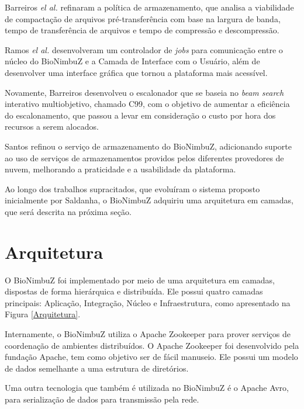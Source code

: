 Barreiros \textit{el al.}\cite{BioNimbuZ_BioCirrus} refinaram a política de armazenamento, que analisa a viabilidade de compactação de arquivos pré-transferência com base na largura de banda, tempo de transferência de arquivos e tempo de compressão e descompressão.

Ramos \textit{el al.}\cite{BioNimbuZ_Ramos} desenvolveram um controlador de \textit{jobs} para comunicação entre o núcleo do BioNimbuZ e a Camada de Interface com o Usuário, além de desenvolver uma interface gráfica que tornou a plataforma mais acessível.

Novamente, Barreiros\cite{BioNimbuZ_Willian_C99} desenvolveu o escalonador que se baseia no \textit{beam search} interativo multiobjetivo, chamado C99, com o objetivo de aumentar a eficiência do escalonamento, que passou a levar em consideração o custo por hora dos recursos a serem alocados.

Santos\cite{BioNimbuZ_Santos} refinou o serviço de armazenamento do BioNimbuZ, adicionando suporte ao uso de serviços de armazenamentos providos pelos diferentes provedores de nuvem, melhorando a praticidade e a usabilidade da plataforma.

Ao longo dos trabalhos supracitados, que evoluíram o sistema proposto inicialmente por Saldanha\cite{Saldanha_BioNimbus}, o BioNimbuZ adquiriu uma arquitetura em camadas, que será descrita na próxima seção.

\section{Arquitetura}
O BioNimbuZ foi implementado por meio de uma arquitetura em camadas, dispostas de forma hierárquica e distribuída. Ele possui quatro camadas principais: Aplicação, Integração, Núcleo e Infraestrutura, como apresentado na Figura \ref{Arquitetura}.

Internamente, o BioNimbuZ utiliza o Apache Zookeeper\cite{Zookeeper} para prover serviços de coordenação de ambientes distribuídos. O Apache Zookeeper foi desenvolvido pela fundação Apache\cite{Apache}, tem como objetivo ser de fácil manuseio. Ele possui um modelo de dados semelhante a uma estrutura de diretórios.

Uma outra tecnologia que também é utilizada no BioNimbuZ é o Apache Avro\cite{Avro}, para serialização de dados para transmissão pela rede.


